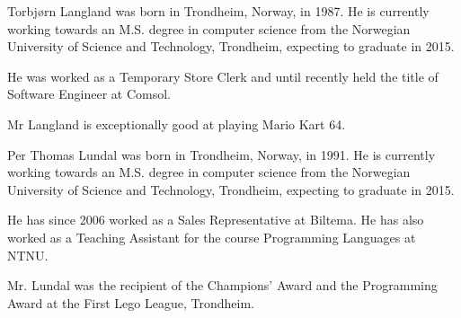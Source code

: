 \documentclass[a4paper]{IEEEtran}
\begin{document}
\begin{IEEEbiography}{Torbjørn Langland}
    was born in Trondheim, Norway, in 1987.
    He is currently working towards an M.S. degree in computer science from the Norwegian University of Science and Technology, Trondheim, expecting to graduate in 2015.

    He was worked as a Temporary Store Clerk and until recently held the title of Software Engineer at Comsol.

    Mr Langland is exceptionally good at playing Mario Kart 64.
\end{IEEEbiography}

\begin{IEEEbiography}{Per Thomas Lundal}
    was born in Trondheim, Norway, in 1991.
    He is currently working towards an M.S. degree in computer science from the Norwegian University of Science and Technology, Trondheim, expecting to graduate in 2015.

    He has since 2006 worked as a Sales Representative at Biltema.
    He has also worked as a Teaching Assistant for the course Programming Languages at NTNU.

    Mr. Lundal was the recipient of the Champions' Award and the Programming Award at the First Lego League, Trondheim.
\end{IEEEbiography}
\end{document}
